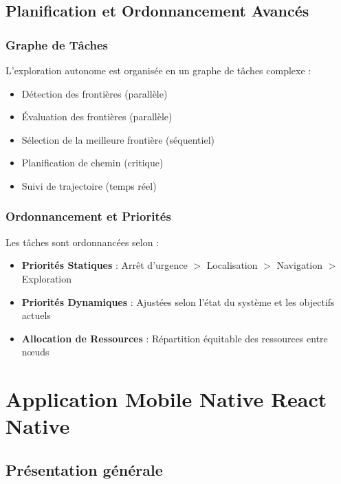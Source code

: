 \documentclass[12pt,a4paper,oneside]{report}
\begin{document}
\section{Planification et Ordonnancement Avancés}

\subsection{Graphe de Tâches}

L'exploration autonome est organisée en un graphe de tâches complexe :

\begin{itemize}
  \item Détection des frontières (parallèle)
  \item Évaluation des frontières (parallèle)
  \item Sélection de la meilleure frontière (séquentiel)
  \item Planification de chemin (critique)
  \item Suivi de trajectoire (temps réel)
\end{itemize}

\subsection{Ordonnancement et Priorités}

Les tâches sont ordonnancées selon :

\begin{itemize}
  \item \textbf{Priorités Statiques} : Arrêt d'urgence $>$ Localisation $>$ Navigation $>$ Exploration
  \item \textbf{Priorités Dynamiques} : Ajustées selon l'état du système et les objectifs actuels
  \item \textbf{Allocation de Ressources} : Répartition équitable des ressources entre nœuds
\end{itemize}

\newpage

\chapter{Application Mobile Native React Native}

\section{Présentation générale}
\end{document}
